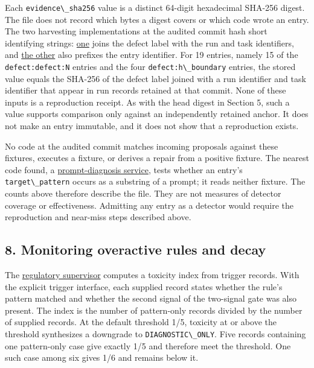 \documentclass[
  11pt,
]{article}
\newcommand{\passthrough}[1]{#1}
\begin{document}
Each \passthrough{\lstinline!evidence\_sha256!} value is a distinct
64-digit hexadecimal SHA-256 digest. The file does not record which
bytes a digest covers or which code wrote an entry. The two harvesting
implementations at the audited commit hash short identifying strings:
\href{https://github.com/dbccpage/the_symbol_game/blob/52cb5457f6c485ba548cfd292f6012a941ed22cf/omega_engine_moscow/domain/immune/seeder.py}{one}
joins the defect label with the run and task identifiers, and
\href{https://github.com/dbccpage/the_symbol_game/blob/52cb5457f6c485ba548cfd292f6012a941ed22cf/omega_engine_operations/domain/symbol_game_bridge/pharmacy_seeder.py}{the
other} also prefixes the entry identifier. For 19 entries, namely 15 of
the \passthrough{\lstinline!defect:defect:N!} entries and the four
\passthrough{\lstinline!defect:h\_boundary!} entries, the stored value
equals the SHA-256 of the defect label joined with a run identifier and
task identifier that appear in run records retained at that commit. None
of these inputs is a reproduction receipt. As with the head digest in
Section 5, such a value supports comparison only against an
independently retained anchor. It does not make an entry immutable, and
it does not show that a reproduction exists.

No code at the audited commit matches incoming proposals against these
fixtures, executes a fixture, or derives a repair from a positive
fixture. The nearest code found, a
\href{https://github.com/dbccpage/the_symbol_game/blob/52cb5457f6c485ba548cfd292f6012a941ed22cf/omega_engine_external_application/prompt_doctor/use_cases/repair_service.py}{prompt-diagnosis
service}, tests whether an entry's
\passthrough{\lstinline!target\_pattern!} occurs as a substring of a
prompt; it reads neither fixture. The counts above therefore describe
the file. They are not measures of detector coverage or effectiveness.
Admitting any entry as a detector would require the reproduction and
near-miss steps described above.

\subsection{8. Monitoring overactive rules and
decay}\label{monitoring-overactive-rules-and-decay}

The
\href{https://github.com/dbccpage/the_symbol_game/blob/52cb5457f6c485ba548cfd292f6012a941ed22cf/omega_engine_symbol_game/domain/immune/treg.py}{regulatory
supervisor} computes a toxicity index from trigger records. With the
explicit trigger interface, each supplied record states whether the
rule's pattern matched and whether the second signal of the two-signal
gate was also present. The index is the number of pattern-only records
divided by the number of supplied records. At the default threshold 1/5,
toxicity at or above the threshold synthesizes a downgrade to
\passthrough{\lstinline!DIAGNOSTIC\_ONLY!}. Five records containing one
pattern-only case give exactly 1/5 and therefore meet the threshold. One
such case among six gives 1/6 and remains below it.
\end{document}
